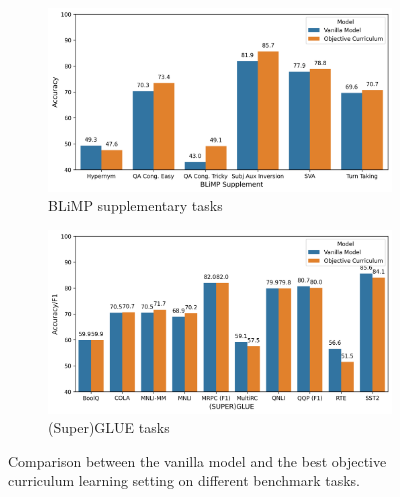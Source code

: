 \begin{figure}[ht!]
    \centering
    \begin{subfigure}[b]{0.48\textwidth}
        \centering
        \includegraphics[width=\textwidth]{chapters/climb/figures/baseline_vs_obj_cl_blimp_supp_new.png}
        \caption{BLiMP supplementary tasks}
        \label{fig:baseline_obj_cl_blimp_supp}
    \end{subfigure}
    \hfill
    \begin{subfigure}[b]{0.48\textwidth}
        \centering
        \includegraphics[width=\textwidth]{chapters/climb/figures/baseline_vs_obj_cl_superglue.png}
        \caption{(Super)GLUE tasks}
        \label{fig:baseline_obj_cl_superglue}
    \end{subfigure}
    \caption{Comparison between the vanilla model and the best objective curriculum learning setting on different benchmark tasks.}
    \label{fig:baseline_obj_cl_comparison}
\end{figure}

